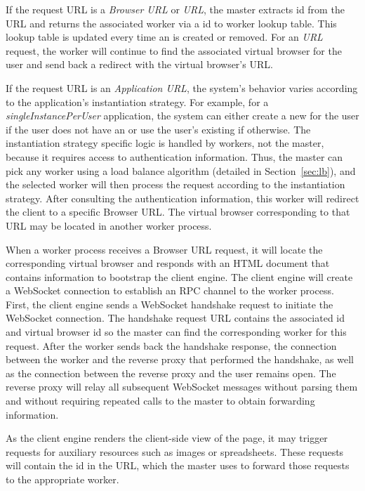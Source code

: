 If the request URL is a \emph{Browser URL} or \emph{\appins URL}, 
the master extracts \appins id from the URL and returns the associated
worker via a \appins id to worker lookup table.
This lookup table is updated every time an \appins{} is created or removed.
For an \emph{\appins URL} request, the worker will continue to find the associated
virtual browser for the user and send back a redirect with the virtual browser's URL.

If the request URL is an \emph{Application URL}, 
the system's behavior varies according to the application's instantiation strategy.
For example, for a \emph{singleInstancePerUser} application,
the system can either create a new \appins{} for the user if the user does not have an
\appins or use the user's existing \appins{} if otherwise.
The instantiation strategy specific logic is handled by workers, not the master,
because it requires access to authentication information.
Thus, the master can pick any worker using a load
balance algorithm (detailed in Section~\ref{sec:lb}),
and the selected worker will then process the request according
to the instantiation strategy.
After consulting the authentication information, this worker will redirect 
the client to a specific Browser URL.   The virtual browser corresponding
to that URL may be located in another worker process.

When a worker process receives a Browser URL request, it will locate the
corresponding virtual browser and responds with an HTML document that contains
information to bootstrap the client engine. 
The client engine will create a WebSocket connection to establish an RPC channel to
the worker process.
First, the client engine sends a WebSocket handshake request to initiate the
WebSocket connection.
The handshake request URL contains the associated \appins id and virtual browser
id so the master can find the corresponding worker for this request.
After the worker sends back the handshake response, the connection
between the worker and the reverse proxy that performed the handshake, 
as well as the connection between the reverse proxy and the user remains open. 
The reverse proxy will relay all subsequent WebSocket messages
without parsing them and without requiring repeated calls to the master
to obtain forwarding information.

As the client engine renders the client-side view of the page, it may trigger
requests for auxiliary resources such as images or spreadsheets. 
These requests will contain the \appins{} id in the URL, which the master
uses to forward those requests to the appropriate worker.


